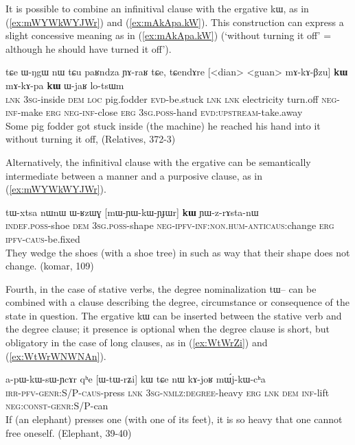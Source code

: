 \documentclass[oldfontcommands,oneside,a4paper,11pt]{article}
\newcommand{\ipa}[1]{{\phon \mbox{#1}}} %
\newcommand{\refb}[1]{(\ref{#1})}
\begin{document}
 


It is possible to combine an infinitival clause with the ergative \ipa{kɯ}, as in  \refb{ex:mWYWkWYJWr} and \refb{ex:mAkApa.kW}.  This construction can express  a slight concessive meaning as in \refb{ex:mAkApa.kW} (`without turning it off' =  although he should have turned it off').

\begin{exe}
\ex \label{ex:mAkApa.kW}
\gll
\ipa{tɕe}   	\ipa{ɯ-ŋgɯ}   	\ipa{nɯ} \ipa{tɕu}   	\ipa{paʁndza}   	\ipa{ɲɤ-raʁ}   	\ipa{tɕe,}   	\ipa{tɕendɤre}   	[<dian>   	<guan>   	\ipa{mɤ-kɤ-βzu}] 	\ipa{\textbf{kɯ}}   	\ipa{mɤ-kɤ-pa}   	\ipa{\textbf{kɯ}}   	\ipa{ɯ-jaʁ}   	\ipa{lo-tsɯm}   \\
\textsc{lnk} \textsc{3sg}-inside \textsc{dem} \textsc{loc} pig.fodder \textsc{evd}-be.stuck \textsc{lnk}
\textsc{lnk} electricity turn.off \textsc{neg-inf}-make \textsc{erg}  \textsc{neg-inf}-close \textsc{erg}  \textsc{3sg.poss}-hand \textsc{evd:upstream}-take.away \\
\glt Some pig fodder got stuck inside (the machine) he reached his hand into it without turning it off, (Relatives, 372-3)
\end{exe} 
 
Alternatively, the infinitival clause with the ergative can be semantically intermediate between a manner and a purposive clause, as in \refb{ex:mWYWkWYJWr}.

\begin{exe}
\ex \label{ex:mWYWkWYJWr}
\gll
\ipa{tɯ-xtsa}   	\ipa{nɯnɯ}   	\ipa{ɯ-ʁzɯɣ}   	[\ipa{mɯ-ɲɯ-kɯ-ɲɟɯr}]   	\ipa{\textbf{kɯ}}   	\ipa{ɲɯ-z-rɤsta-nɯ}   \\
\textsc{indef.poss}-shoe \textsc{dem} \textsc{3sg.poss}-shape \textsc{neg-ipfv-inf:non.hum-anticaus}:change \textsc{erg} \textsc{ipfv-caus}-be.fixed \\
\glt They wedge the shoes (with a shoe tree)  in such as way that their shape does not change. (komar, 109)
\end{exe}

Fourth, in the case of stative verbs, the degree nominalization \ipa{tɯ--} can be combined with   a   clause    describing the degree, circumstance or   consequence of the state in question. The ergative \ipa{kɯ} can be   inserted between the stative verb and the degree clause; it presence is optional when the degree clause is short, but obligatory in the case of long clauses, as in \refb{ex:WtWrZi} and \refb{ex:WtWrWNWNAn}.
 

\begin{exe}
\ex \label{ex:WtWrZi}
\gll
\ipa{a-pɯ-kɯ-sɯ-ɲcɤr}         	\ipa{qʰe}         	[\ipa{ɯ-tɯ-rʑi}]         	\ipa{kɯ}         \ipa{tɕe}         	\ipa{nɯ}         	\ipa{kɤ-joʁ}         	\ipa{mɯ́j-kɯ-cʰa}         \\
\textsc{irr-pfv-genr:S/P-caus}-press \textsc{lnk} \textsc{3sg-nmlz:degree}-heavy \textsc{erg} \textsc{lnk} \textsc{dem} \textsc{inf}-lift \textsc{neg:const-genr:S/P}-can \\
\glt If (an elephant) presses one (with one of its feet), it is so heavy that one cannot free oneself. (Elephant, 39-40)
\end{exe}
\end{document}
